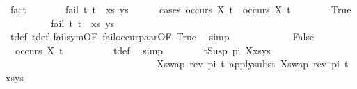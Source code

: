 \begin{isabellebody}
\ fact\isanewline
\ \ \ \ \isamarkupfalse%
\ \isamarkupfalse%
\ {\isachardoublequoteopen}fail\ {\isacharparenleft}{\kern0pt}{\isacharparenleft}{\kern0pt}t{}{\isacharcomma}{\kern0pt}\ t{}{\isacharparenright}{\kern0pt}\ {\isacharhash}{\kern0pt}\ xs{\isacharcomma}{\kern0pt}\ ys{\isacharparenright}{\kern0pt}{\isachardoublequoteclose}\ \isanewline
\ \ \ \ \isamarkupfalse%
{\isacharparenleft}{\kern0pt}cases\ {\isachardoublequoteopen}occurs\ X\ t{}{}\ {\isasymor}\ occurs\ X\ t{}{}{\isachardoublequoteclose}{\isacharparenright}{\kern0pt}\isanewline
\ \ \ \ \ \ \isamarkupfalse%
\ True\isanewline
\ \ \ \ \ \ \isamarkupfalse%
\ \isamarkupfalse%
\ {\isachardoublequoteopen}fail\ {\isacharparenleft}{\kern0pt}{\isacharparenleft}{\kern0pt}t{}{\isacharcomma}{\kern0pt}\ t{}{\isacharparenright}{\kern0pt}\ {\isacharhash}{\kern0pt}\ xs{\isacharcomma}{\kern0pt}\ ys{\isacharparenright}{\kern0pt}{\isachardoublequoteclose}\ \isanewline
\ \ \ \ \ \ \ \ \isamarkupfalse%
\ t{}{\isacharunderscore}{\kern0pt}def\ t{}{\isacharunderscore}{\kern0pt}def\ fail{\isacharunderscore}{\kern0pt}sym{\isacharbrackleft}{\kern0pt}OF\ fail{\isacharunderscore}{\kern0pt}occur{\isacharunderscore}{\kern0pt}paar{\isacharbrackleft}{\kern0pt}OF\ True{\isacharbrackright}{\kern0pt}{\isacharbrackright}{\kern0pt}\ \isamarkupfalse%
\ simp\isanewline
\ \ \ \ \isamarkupfalse%
\isanewline
\ \ \ \ \ \ \isamarkupfalse%
\ False\isanewline
\ \ \ \ \ \ \isamarkupfalse%
\ {\isachardoublequoteopen}{\isasymnot}\ occurs\ X\ t{}{\isachardoublequoteclose}\isanewline
\ \ \ \ \ \ \ \ \isamarkupfalse%
\ t{}{\isacharunderscore}{\kern0pt}def\ \isamarkupfalse%
\ simp\isanewline
\ \ \ \ \ \ \isamarkupfalse%
\ {\isachardoublequoteopen}{\isacharparenleft}{\kern0pt}{\isacharparenleft}{\kern0pt}t{}{\isasymapprox}{\isacharquery}{\kern0pt}Susp\ pi\ X{\isacharparenright}{\kern0pt}{\isacharhash}{\kern0pt}xs{\isacharcomma}{\kern0pt}ys{\isacharparenright}{\kern0pt}\ \isanewline
\ \ \ \ \ \ \ \ \ \ \ \ \ \ \ \ \ \ \ \ \ \ \ \ \ \ \ \ \ \ \ {\isasymturnstile}{\isacharbrackleft}{\kern0pt}{\isacharparenleft}{\kern0pt}X{\isacharcomma}{\kern0pt}swap\ {\isacharparenleft}{\kern0pt}rev\ pi{\isacharparenright}{\kern0pt}\ t{}{\isacharparenright}{\kern0pt}{\isacharbrackright}{\kern0pt}{\isasymleadsto}\ apply{\isacharunderscore}{\kern0pt}subst\ {\isacharbrackleft}{\kern0pt}{\isacharparenleft}{\kern0pt}X{\isacharcomma}{\kern0pt}swap\ {\isacharparenleft}{\kern0pt}rev\ pi{\isacharparenright}{\kern0pt}\ t{}{\isacharparenright}{\kern0pt}{\isacharbrackright}{\kern0pt}\ {\isacharparenleft}{\kern0pt}xs{\isacharcomma}{\kern0pt}ys{\isacharparenright}{\kern0pt}{\isachardoublequoteclose}\isanewline

\end{isabellebody}
